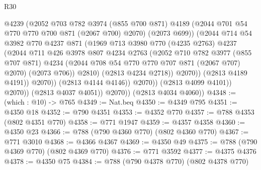 \begin{lexlean}{R30}
\begin{coremodule}
                                @4239
                                (@2052
                                  @703
                                  @782
                                  @3974
                                  (@855 @700 @871)
                                  @4189
                                  (@2044 @701 @54 @770 @770 @700 @871 (@2067 @700) @2070)
                                  (@2073 @699))
                                (@2044
                                  @714
                                  @54
                                  @3982
                                  @770
                                  @4237
                                  @871
                                  (@1969
                                    @713
                                    @3980
                                    @770
                                    (@4235 @2763)
                                    @4237
                                    (@2044
                                      @711
                                      @426
                                      @3978
                                      @807
                                      @4234
                                      @2763
                                      (@2052
                                        @710
                                        @782
                                        @3977
                                        (@855 @707 @871)
                                        @4234
                                        (@2044 @708 @54 @770 @770 @707 @871 (@2067 @707) @2070)
                                        (@2073 @706))
                                      @2810)
                                    (@2813 @4234 @2718))
                                  @2070))
                              (@2813 @4189 @4191))
                            @2070))
                        (@2813 @4144 @4146))
                      @2070))
                  (@2813 @4099 @4101))
                @2070))
            (@2813 @4037 @4051))
          @2070))
      (@2813 @4034 @4060))
@4348 := (which : @10) -> @765
@4349 := Nat.beq
@4350 := @4349 @795
@4351 := @4350 @18
@4352 := @790 @4351
@4353 := @4352 @770
@4357 := @788 @4353 (@802 @4351 @770)
@4358 := @771 @1947
@4359 := @4357 @4358
@4360 := @4350 @23
@4366 := @788 (@790 @4360 @770) (@802 @4360 @770)
@4367 := @771 @3010
@4368 := @4366 @4367
@4369 := @4350 @49
@4375 := @788 (@790 @4369 @770) (@802 @4369 @770)
@4376 := @771 @3592
@4377 := @4375 @4376
@4378 := @4350 @75
@4384 := @788 (@790 @4378 @770) (@802 @4378 @770)

\end{coremodule}
\end{lexlean}
